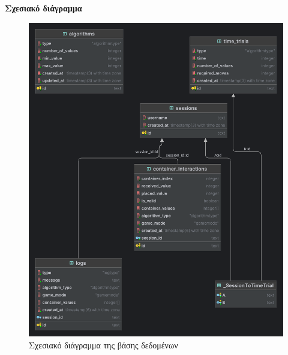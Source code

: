 \textbf{Σχεσιακό διάγραμμα}

\begin{figure}[H]
    \centering
    \includegraphics[width=0.8\linewidth]{sections/appendices/a/images/db_schema}
    \caption{Σχεσιακό διάγραμμα της βάσης δεδομένων}
    \label{fig:db_schema}
\end{figure}
